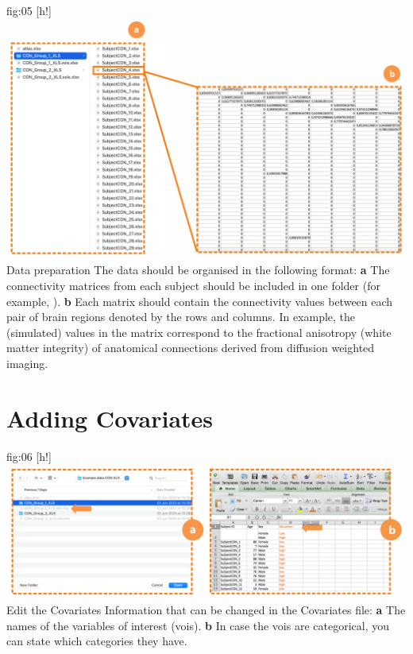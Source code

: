 \documentclass[justified]{tufte-handout}
\begin{document}
	{fig:05}
	{
	[h!]
	\includegraphics{fig05.png}
	}
	{Data preparation}
	{
	The data should be organised in the following format:
	{\bf a} The connectivity matrices from each subject should be included in one folder (for example, ). 
	{\bf b} Each matrix should contain the connectivity values between each pair of brain regions denoted by the rows and columns. In example, the (simulated) values in the matrix correspond to the fractional anisotropy (white matter integrity) of anatomical connections derived from diffusion weighted imaging.
	} 

\section{Adding Covariates}

	{fig:06}
	{
	[h!]
	\includegraphics{fig06.png}
	}
	{Edit the Covariates}
	{
	Information that can be changed in the Covariates file: 
	{\bf a} The names of the variables of interest (vois).
	{\bf b} In case the vois are categorical, you can state which categories they have.
	}
	
\end{document}
